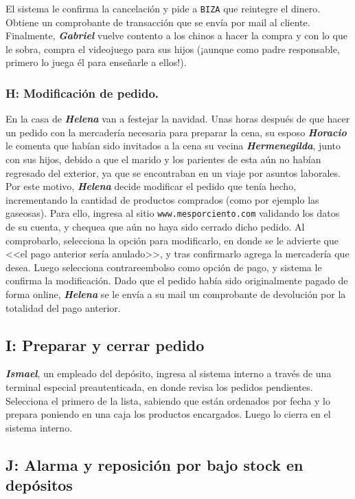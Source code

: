 El sistema le confirma la cancelación y pide a \texttt{BIZA} que reintegre el
dinero. Obtiene un comprobante de transacción que se envía por mail al
cliente. Finalmente, \textbf{\emph{Gabriel}} vuelve contento a los chinos a
hacer la compra y con lo que le sobra, compra el videojuego para sus hijos
(¡aunque como padre responsable, primero lo juega él para enseñarle a ellos!).

\subsubsection{H: Modificación de pedido.}

En la casa de \textbf{\emph{Helena}} van a festejar la navidad. Unas horas
después de que hacer un pedido con la mercadería necesaria para preparar la
cena, su esposo \textbf{\emph{Horacio}} le comenta que habían sido invitados a
la cena su vecina \textbf{\emph{Hermenegilda}}, junto con sus hijos, debido a
que el marido y los parientes de esta aún no habían regresado del exterior, ya
que se encontraban en un viaje por asuntos laborales. Por este motivo,
\textbf{\emph{Helena}} decide modificar el pedido que tenía hecho,
incrementando la cantidad de productos comprados (como por ejemplo las
gaseosas). Para ello, ingresa al sitio \texttt{www.mesporciento.com} validando
los datos de su cuenta, y chequea que aún no haya sido cerrado dicho pedido.
Al comprobarlo, selecciona la opción para modificarlo, en donde se le advierte
que <<el pago anterior sería anulado>>, y tras confirmarlo agrega la
mercadería que desea. Luego selecciona contrareembolso como opción de pago, y
sistema le confirma la modificación. Dado que el pedido había sido
originalmente pagado de forma online, \textbf{\emph{Helena}} se le envía a su
mail un comprobante de devolución por la totalidad del pago anterior.

\subsection{I: Preparar y cerrar pedido}

\textbf{\emph{Ismael}}, un empleado del depósito, ingresa al sistema interno a
través de una terminal especial preautenticada, en donde revisa los pedidos
pendientes. Selecciona el primero de la lista, sabiendo que están ordenados por fecha
y lo prepara poniendo en una caja los productos encargados. Luego lo cierra en
el sistema interno.

\subsection{J: Alarma y reposición por bajo stock en depósitos}

